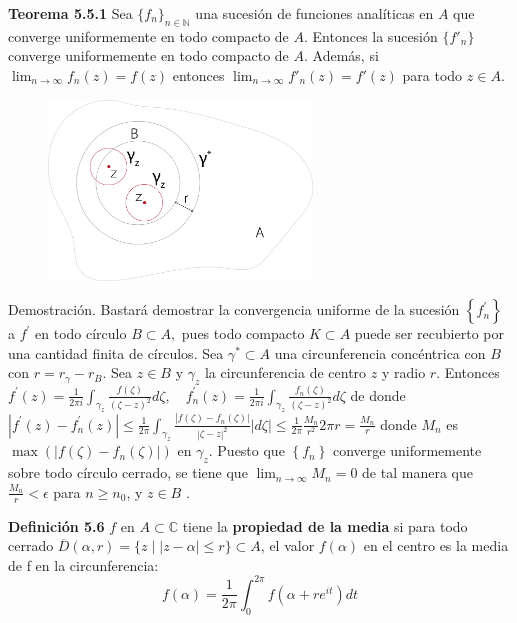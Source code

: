 \documentclass[a4paper, 11pt]{extarticle}
\newcommand{\tma}[1]{\textcolor{rojo}{\textbf{Teorema #1}}}
\newcommand{\defi}[1]{\textcolor{azul}{\textbf{Definición #1}}}
\newcommand{\dem}[1]{\textcolor{gris}{\small{Demostración. #1}}}
\begin{document}
\begin{multicols*}{2}
\tma{5.5.1} Sea \(\{ f_n \}_{n \in \mathbb{N}}\) una sucesión de funciones 
analíticas en \(A\) que converge uniformemente en todo compacto de \(A\).
Entonces la sucesión \(\{ f'_n \}\) converge uniformemente en todo compacto
de \(A\). Además, si \(\lim_{n \to \infty} f_n(z) = f(z)\) entonces \(\lim_{n \to \infty} f'_n(z) = f'(z)\) para todo \(z \in A\).

\begin{figure}[H]
\centering
\includegraphics[width=7cm]{imagenes/T-5_5_1.png}
\end{figure}

\dem{   Bastará demostrar la convergencia uniforme de la sucesión
$\left\{f_{n}^{\prime}\right\}$ a $f^{\prime}$ en todo círculo $B \subset A,$ pues todo compacto
 $K \subset A$ puede ser recubierto por una cantidad finita de círculos.
Sea $\gamma^{*} \subset A$ una circunferencia concéntrica con $B$ con $r = r_\gamma - r_B$.
 Sea $z \in B$ y $\gamma_{z}$ la circunferencia de centro $z$ y 
radio $r$. Entonces
$
f^{\prime}(z)=\frac{1}{2 \pi i} \int_{\gamma_{z}} \frac{f(\zeta)}{(\zeta-z)^{2}} d \zeta, \quad f_{n}^{\prime}(z)
=\frac{1}{2 \pi i} \int_{\gamma_{z}} \frac{f_{n}(\zeta)}{(\zeta-z)^{2}} d \zeta
$
de donde
$
|f^{\prime}(z)-f_{n}^{\prime}(z)|  \leq \frac{1}{2 \pi} \int_{\gamma_{z}} 
\frac{\left|f(\zeta)-f_{n}(\zeta)|}{|\zeta-z|^{2}}|d \zeta|
 \leq \frac{1}{2 \pi} \frac{M_{n}}{r^{2}} 2 \pi r=\frac{M_{n}}{r}
$
donde $M_{n}$ es $\max(\left|f(\zeta)-f_{n}(\zeta)\right|)$
en $\gamma_z$.
Puesto que $\left\{f_{n}\right\}$ converge uniformemente sobre todo círculo 
cerrado, se tiene que
$
\lim _{n \rightarrow \infty} M_{n}=0
$ de tal manera que $\frac{M_{n}}{r}<\epsilon$
para $n \geq n_{0}$, y $z \in B$ .
}

\defi{5.6} \(f\) en \(A \subset \mathbb{C}\) tiene la \textbf{propiedad de la media}
si para todo cerrado \(\overline{D}(\alpha, r) = \{ z \;|\; |z - \alpha| \le r
\} \subset A\), el valor \(f(\alpha)\) en el centro es la media de f en la
circunferencia:
\[ f(\alpha) = \frac{1}{2 \pi} \int_{0}^{2 \pi} f\left(\alpha+r e^{i t}\right) d t \]


\end{multicols*}
\end{document}
